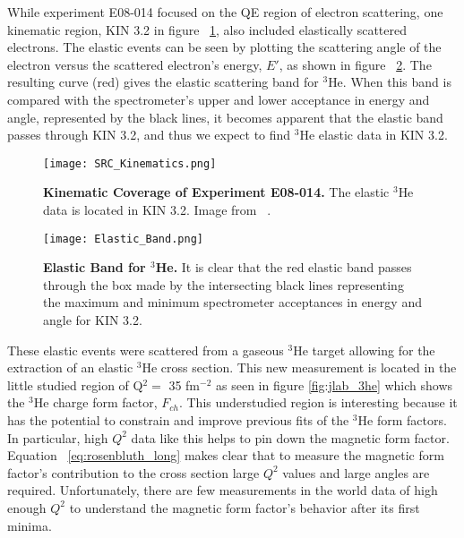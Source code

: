 While experiment E08-014 focused on the QE region of electron scattering, one kinematic region, KIN 3.2 in figure ~\ref{fig:kin3.2}, also included elastically scattered electrons. The elastic events can be seen by plotting the scattering angle of the electron versus the scattered electron's energy, $E'$, as shown in figure ~\ref{fig:elastic_band}. The resulting curve (red) gives the elastic scattering band for $^3$He. When this band is compared with the spectrometer's upper and lower acceptance in energy and angle, represented by the black lines, it becomes apparent that the elastic band passes through KIN 3.2, and thus we expect to find $^3$He elastic data in KIN 3.2.  

\begin{figure}[!ht]
\begin{center}
\texttt{[image: SRC\_Kinematics.png]}
\end{center}
\caption{
{\bf{Kinematic Coverage of Experiment E08-014.}} The elastic $^3$He data is located in KIN 3.2. Image from ~\cite{Thesis:Ye}.}
\label{fig:kin3.2}
\end{figure}

\begin{figure}[!ht]
\begin{center}
\texttt{[image: Elastic\_Band.png]}
\end{center}
\caption{
{\bf{Elastic Band for $^3$He.}} It is clear that the red elastic band passes through the box made by the intersecting black lines representing the maximum and minimum spectrometer acceptances in energy and angle for KIN 3.2.}
\label{fig:elastic_band}
\end{figure}

These elastic events were scattered from a gaseous $^3$He target allowing for the extraction of an elastic $^3$He cross section. This new measurement is located in the little studied region of Q$^2 = $ 35 fm$^{-2}$ as seen in figure \ref{fig:jlab_3he} which shows the $^3$He charge form factor, $F_{ch}$. This understudied region is interesting because it has the potential to constrain and improve previous fits of the $^3$He form factors. In particular, high $Q^2$ data like this helps to pin down the magnetic form factor. Equation ~\ref{eq:rosenbluth_long} makes clear that to measure the magnetic form factor's contribution to the cross section large $Q^2$ values and large angles are required. Unfortunately, there are few measurements in the world data of high enough $Q^2$ to understand the magnetic form factor's behavior after its first minima. 

